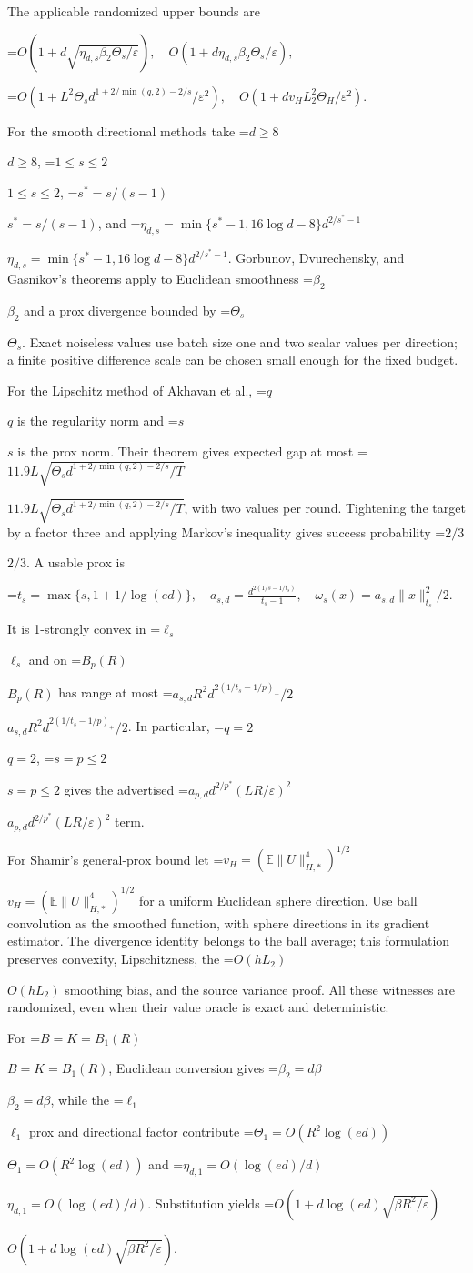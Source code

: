 \documentclass[10pt,a4paper]{article}
\newcommand{\AtlasMath}[1]{\par\begingroup\centering\setbox0=\hbox{$\displaystyle #1$}\ifdim\wd0>1.4\linewidth\typeout{ATLAS WIDE FORMULA: \the\wd0}\fi\ifdim\wd0>\linewidth\resizebox{\linewidth}{!}{\box0}\else\box0\fi\par\endgroup}
\newcommand{\AtlasInlineMath}[1]{\begingroup\setbox0=\hbox{$#1$}\ifdim\wd0>.4\linewidth\endgroup\AtlasMath{#1}\else\endgroup$#1$\fi}
\begin{document}
The applicable randomized upper bounds are

\AtlasMath{O(1+d\sqrt{\eta_{d,s}\beta_2\Theta_s/\varepsilon}),\quad O(1+d\eta_{d,s}\beta_2\Theta_s/\varepsilon),}


\AtlasMath{O(1+L^2\Theta_s d^{1+2/\min(q,2)-2/s}/\varepsilon^2),\quad O(1+dv_H L_2^2\Theta_H/\varepsilon^2).}


For the smooth directional methods take \AtlasInlineMath{d\ge8}, \AtlasInlineMath{1\le s\le2}, \AtlasInlineMath{s^*=s/(s-1)}, and \AtlasInlineMath{\eta_{d,s}=\min\{s^*-1,16\log d-8\}d^{2/s^*-1}}. Gorbunov, Dvurechensky, and Gasnikov's theorems apply to Euclidean smoothness \AtlasInlineMath{\beta_2} and a prox divergence bounded by \AtlasInlineMath{\Theta_s}. Exact noiseless values use batch size one and two scalar values per direction; a finite positive difference scale can be chosen small enough for the fixed budget.

For the Lipschitz method of Akhavan et al., \AtlasInlineMath{q} is the regularity norm and \AtlasInlineMath{s} is the prox norm. Their theorem gives expected gap at most \AtlasInlineMath{11.9L\sqrt{\Theta_s d^{1+2/\min(q,2)-2/s}/T}}, with two values per round. Tightening the target by a factor three and applying Markov's inequality gives success probability \AtlasInlineMath{2/3}. A usable prox is

\AtlasMath{t_s=\max\{s,1+1/\log(ed)\},\quad a_{s,d}=\frac{d^{2(1/s-1/t_s)}}{t_s-1},\quad\omega_s(x)=a_{s,d}\|x\|_{t_s}^2/2.}

It is 1-strongly convex in \AtlasInlineMath{\ell_s} and on \AtlasInlineMath{B_p(R)} has range at most \AtlasInlineMath{a_{s,d}R^2d^{2(1/t_s-1/p)_+}/2}. In particular, \AtlasInlineMath{q=2}, \AtlasInlineMath{s=p\le2} gives the advertised \AtlasInlineMath{a_{p,d}d^{2/p^*}(LR/\varepsilon)^2} term.

For Shamir's general-prox bound let \AtlasInlineMath{v_H=(\mathbb E\|U\|_{H,*}^4)^{1/2}} for a uniform Euclidean sphere direction. Use ball convolution as the smoothed function, with sphere directions in its gradient estimator. The divergence identity belongs to the ball average; this formulation preserves convexity, Lipschitzness, the \AtlasInlineMath{O(hL_2)} smoothing bias, and the source variance proof. All these witnesses are randomized, even when their value oracle is exact and deterministic.

For \AtlasInlineMath{B=K=B_1(R)}, Euclidean conversion gives \AtlasInlineMath{\beta_2=d\beta}, while the \AtlasInlineMath{\ell_1} prox and directional factor contribute \AtlasInlineMath{\Theta_1=O(R^2\log(ed))} and \AtlasInlineMath{\eta_{d,1}=O(\log(ed)/d)}. Substitution yields \AtlasInlineMath{O(1+d\log(ed)\sqrt{\beta R^2/\varepsilon})}.
\end{document}
